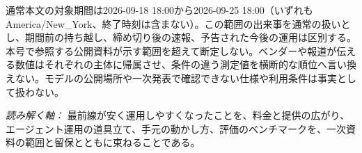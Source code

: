 \vspace{2mm}
\begin{claimboundary}[この号の読み方]
通常本文の対象期間は2026-09-18 18:00から2026-09-25 18:00（いずれもAmerica/New\_York、終了時刻は含まない）。この範囲の出来事を通常の扱いとし、期間前の持ち越し、締め切り後の速報、予告された今後の運用は区別する。本号で参照する公開資料が示す範囲を超えて断定しない。ベンダーや報道が伝える数値はそれぞれの主体に帰属させ、条件の違う測定値を横断的な順位へ言い換えない。モデルの公開場所や一次発表で確認できない仕様や利用条件は事実として扱わない。
\end{claimboundary}

\vspace{2mm}
\noindent\textit{読み解く軸：} 最前線が安く運用しやすくなったことを、料金と提供の広がり、エージェント運用の道具立て、手元の動かし方、評価のベンチマークを、一次資料の範囲と留保とともに束ねることである。
